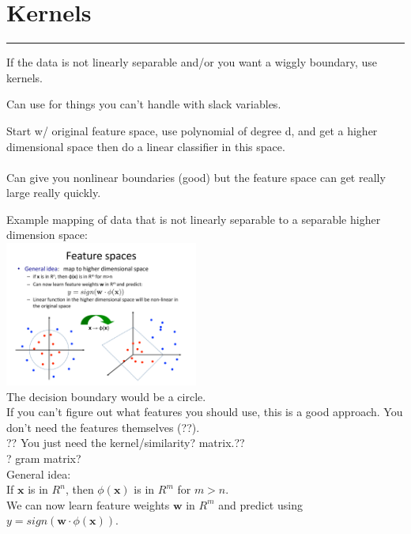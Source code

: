 \section{Kernels}
\smallskip \hrule height 2pt \smallskip
If the data is not linearly separable and/or you want a wiggly boundary, use kernels. 

Can use for things you can't handle with slack variables.  %

Start w/ original feature space, use polynomial of degree d, and get a higher dimensional space
    then do a linear classifier in this space.   %
\hfill \\  \hfill \\

Can give you nonlinear boundaries (good) but the feature space can get really large really quickly. 

Example mapping of data that is not linearly separable to a separable higher dimension space: \hfill \\
\includegraphics[width=2.5in]{figures/example_kernel_separation.pdf}  \hfill \\

The decision boundary would be a circle.  %
\hfill \\

If you can't figure out what features you should use, this is a good approach.  %
You don't need the features themselves (??).   \hfill \\
?? You just need the kernel/similarity? matrix.??   \hfill \\
? gram matrix?   \hfill \\


General idea: \hfill \\
If $\bm{x}$ is in $R^n$, then $\phi(\bm{x})$ is in $R^m$ for $m>n$. \hfill \\
We can now learn feature weights $\bm{w}$ in $R^m$ and predict using $y = sign(\bm{w} \cdot \phi(\bm{x}))$. \hfill \\
\hfill \\

